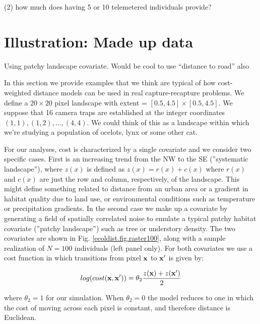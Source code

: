 (2) how much does having 5 or 10 telemetered individuals provide?


\section{Illustration: Made up data}

Using patchy landscape covariate.
Would be cool to use ``distance to road'' also


In this section we provide examples that we think are typical of how
cost-weighted distance models can be used in real capture-recapture
problems.  We define a $20 \times 20$ pixel landscape with 
extent = $[0.5, 4.5] \times [0.5, 4.5]$.  
We suppose that 16 camera traps are established at the integer coordinates
$(1,1), (1,2), \ldots, (4,4)$. We could think of this as a landscape
within which we're studying a population of ocelots, lynx or some
other cat.

For our analyses, cost is characterized by a single covariate 
and we consider two specific cases. First is an increasing trend from
the NW to the SE (''systematic landscape''), where $z(x)$ is defined as
$z(x) = r(x) + c(x)$ where $r(x)$ and $c(x)$ are just the row and
column, respectively, of the landscape.  This might define something
related to distance from an urban area or a gradient in habitat
quality due to land use, or environmental conditions such as
temperature or precipitation gradients.  In the second case we make up
a covariate by generating a field of spatially correlated noise to
emulate a typical patchy habitat covariate (''patchy landscape'') such as
tree or understory density. The two covariates are shown in
Fig. \ref{ecoldist.fig.raster100}, along with a sample realization of
$N=100$ individuals (left panel only).  For both covariates we use a
cost function in which transitions from pixel ${\bf x}$ to ${\bf x}'$
is given by:

\[
 log(cost({\bf x},{\bf x}'))=  \theta_2 \frac{z({\bf x}) + z({\bf x}')}{2}
\]

{\flushleft where} $\theta_2 = 1$ for our simulation.
When $\theta_2=0$ the
model reduces to one in which the cost of moving across each pixel is
constant, and therefore distance is Euclidean.








